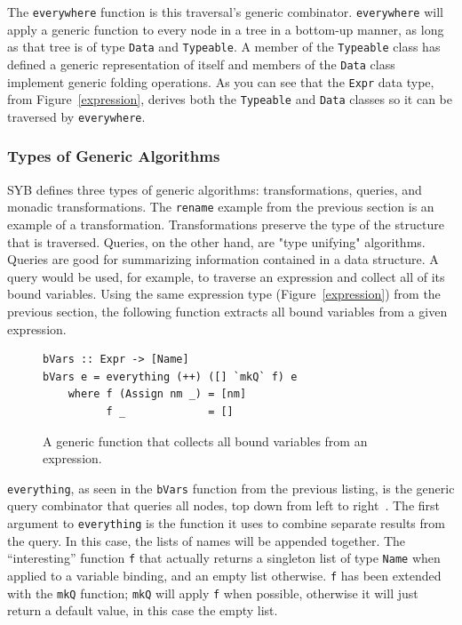 	The \texttt{everywhere} function is this traversal's generic combinator. \texttt{everywhere} will apply a generic function to every node in a tree in a bottom-up manner, as long as that tree is of type \texttt{Data} and \texttt{Typeable}. A member of the \texttt{Typeable} class has defined a generic representation of itself and members of the \texttt{Data} class implement generic folding operations.	As you can see that the \texttt{Expr} data type, from Figure~\ref{expression}, derives both the \texttt{Typeable} and \texttt{Data} classes so it can be traversed by \texttt{everywhere}.  
	
\subsubsection{Types of Generic Algorithms}

SYB defines three types of generic algorithms: transformations, queries, and monadic transformations. The \texttt{rename} example from the previous section is an example of a transformation. Transformations preserve the type of the structure that is traversed. Queries, on the other hand, are "type unifying" algorithms. Queries are good for summarizing information contained in a data structure. A query would be used, for example, to traverse an expression and collect all of its bound variables. Using the same expression type (Figure~\ref{expression}) from the previous section, the following function extracts all bound variables from a given expression.

\begin{figure}[t]
\begin{lstlisting}
bVars :: Expr -> [Name]
bVars e = everything (++) ([] `mkQ` f) e
	where f (Assign nm _) = [nm]
          f _             = []
\end{lstlisting}
\caption{A generic function that collects all bound variables from an expression.}
\end{figure}

\texttt{everything}, as seen in the \texttt{bVars} function from the previous listing, is the generic query combinator that queries all nodes, top down from left to right~\citep{sybDocs}. The first argument to \texttt{everything} is the function it uses to combine separate results from the query. In this case, the lists of names will be appended together. The ``interesting'' function \texttt{f} that actually returns a singleton list of type \texttt{Name} when applied to a variable binding, and an empty list otherwise. \texttt{f} has been extended with the \texttt{mkQ} function; \texttt{mkQ} will apply \texttt{f} when possible, otherwise it will just return a default value, in this case the empty list.

